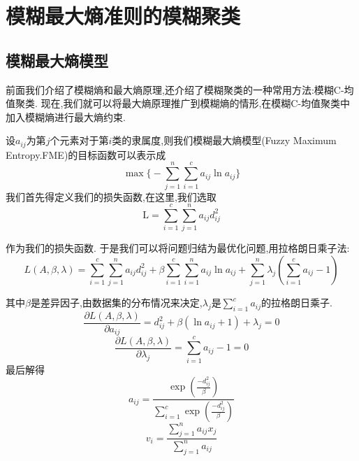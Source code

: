\chapter[模糊最大熵准则的模糊聚类模型]{模糊最大熵准则的模糊聚类}

\section{模糊最大熵模型}
前面我们介绍了模糊熵和最大熵原理,还介绍了模糊聚类的一种常用方法:模糊C-均值聚类.
现在,我们就可以将最大熵原理推广到模糊熵的情形,在模糊C-均值聚类中加入模糊熵进行最大熵约束.
\par
设$a_{i j}$为第$j$个元素对于第$i$类的隶属度,则我们模糊最大熵模型(Fuzzy Maximum Entropy.FME)的目标函数可以表示成
\begin{equation}
    \max \biggl\{-\sum_{j=1}^{n} \sum_{i=1}^{c} a_{i j}\ln a_{i j}\biggr\}
    \label{MEC}
\end{equation}
我们首先得定义我们的损失函数,在这里,我们选取
\begin{equation*}
    \mathrm{L}=\sum_{i=1}^{c} \sum_{j=1}^{n}a_{i j} d_{i j}^2
\end{equation*}

作为我们的损失函数.
于是我们可以将问题归结为最优化问题,用拉格朗日乘子法:
\begin{equation}
    L(A,\beta ,\lambda)=\sum_{i=1}^{c} \sum_{j=1}^{n} a_{i j} d_{i j}^2+\beta \sum_{i=1}^{c} \sum_{i=1}^{n} a_{i j} \ln a_{i j}+\sum_{j=1}^{n} \lambda_{j}\left(\sum_{i=1}^{c} a_{i j}-1\right)
    \label{MLagrange}
\end{equation}

其中$\beta$是差异因子,由数据集的分布情况来决定,$\lambda_j$是$\sum\limits_{i=1}^{c} a_{i j}$的拉格朗日乘子.
\begin{equation}
    \frac{\partial L(A,\beta ,\lambda) }{\partial a_{i j}} =d_{i j}^2+\beta(\ln a_{i j}+1)+\lambda_j=0
\end{equation}
\begin{equation}
    \frac{\partial L(A,\beta ,\lambda)}{\partial \lambda_j}=\sum_{i=1}^{c} a_{i j}-1=0
\end{equation}
最后解得
\begin{equation}
    a_{i j}=\frac{ \exp(\frac{-d_{i j}^2}{\beta})}{\sum\limits_{i=1}^c\exp(\frac{-d_{i j}^2}{\beta})}
    \label{Maij}
\end{equation}
\begin{equation}
    v_i =\frac{\sum\limits_{j=1}^n a_{i j} x_j}{\sum\limits_{j=1}^n a_{i j}}
    \label{Mvij}
\end{equation}

